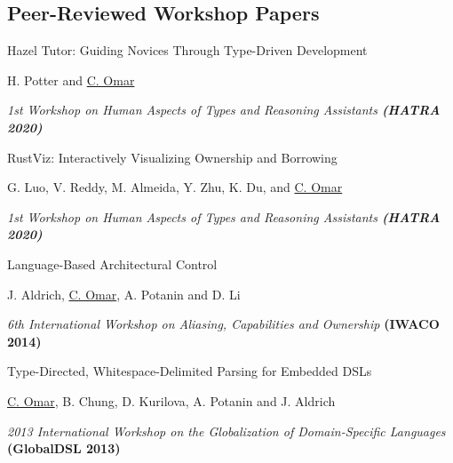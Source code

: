 \documentclass[10pt,letterpaper]{article}
\renewenvironment{itemize}{
  \begin{list}{}{
    \setlength{\leftmargin}{1.25em}
    \setlength{\itemsep}{0.25em}
    \setlength{\parskip}{0pt}
    \setlength{\parsep}{0.2em}
  }
}{
  \end{list}
}
\begin{document}
\subsection*{Peer-Reviewed Workshop Papers}

\begin{enumerate}[resume]
\item Hazel Tutor: Guiding Novices Through Type-Driven Development 
  \begin{itemize}
    \item H. Potter and \underline{C. Omar}
    \item \textit{1st Workshop on Human Aspects of Types and Reasoning Assistants \textbf{(HATRA 2020)}}
  \end{itemize}
\item RustViz: Interactively Visualizing Ownership and Borrowing
  \begin{itemize}
    \item G. Luo, V. Reddy, M. Almeida, Y. Zhu, K. Du, and \underline{C. Omar}
    \item \textit{1st Workshop on Human Aspects of Types and Reasoning Assistants \textbf{(HATRA 2020)}}
  \end{itemize}
\item Language-Based Architectural Control
  \begin{itemize}
    \item J. Aldrich, \underline{C. Omar}, A. Potanin and D. Li
    \item \textit{6th International Workshop on Aliasing, Capabilities and Ownership} {\textbf{(IWACO 2014)}}
  \end{itemize}
\item Type-Directed, Whitespace-Delimited Parsing for Embedded DSLs
  \begin{itemize}
    \item \underline{C. Omar}, B. Chung, D. Kurilova, A. Potanin and J. Aldrich
    \item \textit{2013 International Workshop on the Globalization of Domain-Specific Languages} {\textbf{(GlobalDSL 2013)}}
  \end{itemize}
\end{enumerate}

\end{document}

